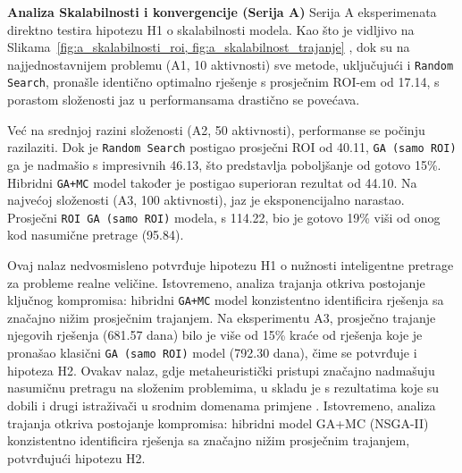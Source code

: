 \textbf{Analiza Skalabilnosti i konvergencije (Serija A)}
Serija A eksperimenata direktno testira hipotezu H1 o skalabilnosti modela. Kao što je vidljivo na Slikama~\ref{fig:a_skalabilnosti_roi, fig:a_skalabilnost_trajanje} , dok su na najjednostavnijem problemu (A1, 10 aktivnosti) sve metode, uključujući i \texttt{Random Search}, pronašle identično optimalno rješenje s prosječnim ROI-em od 17.14, s porastom složenosti jaz u performansama drastično se povećava.

Već na srednjoj razini složenosti (A2, 50 aktivnosti), performanse se počinju razilaziti. Dok je \texttt{Random Search} postigao prosječni ROI od 40.11, \texttt{GA (samo ROI)} ga je nadmašio s impresivnih 46.13, što predstavlja poboljšanje od gotovo 15\%. Hibridni \texttt{GA+MC} model također je postigao superioran rezultat od 44.10. Na najvećoj složenosti (A3, 100 aktivnosti), jaz je eksponencijalno narastao. Prosječni \texttt{ROI GA (samo ROI)} modela, s 114.22, bio je gotovo 19\% viši od onog kod nasumične pretrage (95.84).

Ovaj nalaz nedvosmisleno potvrđuje hipotezu H1 o nužnosti inteligentne pretrage za probleme realne veličine. Istovremeno, analiza trajanja otkriva postojanje ključnog kompromisa: hibridni \texttt{GA+MC} model konzistentno identificira rješenja sa značajno nižim prosječnim trajanjem. Na eksperimentu A3, prosječno trajanje njegovih rješenja (681.57 dana) bilo je više od 15\% kraće od rješenja koje je pronašao klasični \texttt{GA (samo ROI)} model (792.30 dana), čime se potvrđuje i hipoteza H2.
Ovakav nalaz, gdje metaheuristički pristupi značajno nadmašuju nasumičnu pretragu na složenim problemima, u skladu je s rezultatima koje su dobili i drugi istraživači u srodnim domenama primjene \cite{Gandomi2013}. Istovremeno, analiza trajanja otkriva postojanje kompromisa: hibridni model GA+MC (NSGA-II) konzistentno identificira rješenja sa značajno nižim prosječnim trajanjem, potvrđujući hipotezu H2.

